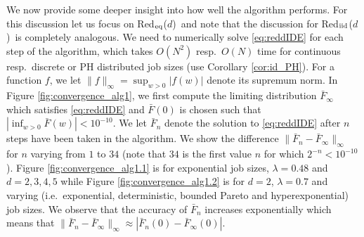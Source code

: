 \documentclass[12pt]{report}
\newcommand{\Redid}{Red$_{\textup{eq}}$($d$)}
\newcommand{\Redind}{Red$_{\textup{iid}}$($d$)}
\begin{document}
We now provide some deeper insight into how well the algorithm performs. For this discussion let us focus on \Redid\ and note that the discussion for \Redind\ is completely analogous. We need to numerically solve \eqref{eq:reddIDE} for each step of the algorithm, which takes $O(N^2)$ resp.~$O(N)$ time for continuous resp.~discrete or PH distributed job sizes (use Corollary \ref{cor:id_PH}). For a function $f$, we let $\|f\|_\infty=\sup_{w>0}|f(w)|$ denote its supremum norm. In Figure \ref{fig:convergence_alg1}, we first compute the limiting distribution $\bar F_{\infty}$ which satisfies \eqref{eq:reddIDE} and $\bar F(0)$ is chosen such that $|\inf_{w>0} \bar F(w)| < 10^{-10}$. We let $\bar F_n$ denote the solution to \eqref{eq:reddIDE} after $n$ steps have been taken in the algorithm. We show the difference $\|\bar F_n - \bar F_\infty\|_\infty$ for $n$ varying from $1$ to $34$ (note that $34$ is the first value $n$ for which $2^{-n}<10^{-10}$). Figure \ref{fig:convergence_alg1.1} is for exponential job sizes, $\lambda = 0.48$ and $d=2,3,4,5$ while Figure \ref{fig:convergence_alg1.2} is for $d=2$, $\lambda = 0.7$ and varying (i.e.~exponential, deterministic, bounded Pareto and hyperexponential) job sizes. We observe that the accuracy of $\bar F_n$ increases exponentially which means that $\|\bar F_n - \bar F_{\infty}\|_\infty \approx  |\bar F_n(0) - \bar F_\infty(0)|$.
\end{document}
